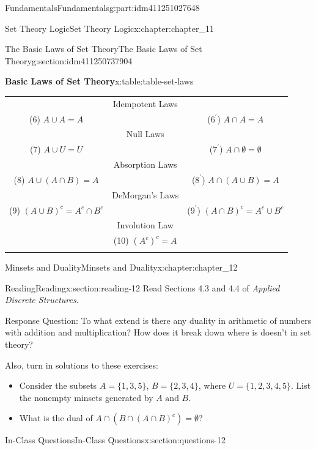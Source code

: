 \documentclass[oneside,10pt,]{book}
\numberwithin{equation}{section}
\newcommand{\hrulethin}  {\noalign{\hrule height 0.04em}}
\begin{document}
\begin{partptx}{Fundamentals}{}{Fundamentals}{}{}{g:part:idm411251027648}
\begin{chapterptx}{Set Theory Logic}{}{Set Theory Logic}{}{}{x:chapter:chapter_11}
\begin{sectionptx}{The Basic Laws of Set Theory}{}{The Basic Laws of Set Theory}{}{}{g:section:idm411250737904}
\begin{tableptx}{\textbf{Basic Laws of Set Theory}}{x:table:table-set-laws}{}
{\begin{tabular}{ccc}
&Idempotent Laws&\tabularnewline[0pt]
(6) \(A \cup  A = A\)&&(\(6^{\prime}\)) \(A\cap  A = A\)\tabularnewline\hrulethin
&Null Laws&\tabularnewline[0pt]
(7) \(A \cup  U = U\)&&(\(7^{\prime}\)) \(A \cap  \emptyset  =\emptyset\)\tabularnewline\hrulethin
&Absorption Laws&\tabularnewline[0pt]
(8) \(A \cup  (A\cap  B) = A\)&&(\(8^{\prime}\)) \(A\cap (A \cup  B) = A\)\tabularnewline\hrulethin
&DeMorgan's Laws&\tabularnewline[0pt]
(9) \((A \cup  B)^c= A^c\cap  B^c\)&&(\(9^{\prime}\)) \((A\cap  B)^c = A^c \cup  B^c\)\tabularnewline\hrulethin
&Involution Law&\tabularnewline[0pt]
&(10) \((A^c)^c= A\)&\tabularnewline\hrulethin
\end{tabular}
}%
\end{tableptx}%
\end{sectionptx}
\end{chapterptx}
%
\typeout{************************************************}
\typeout{************************************************}
%
\begin{chapterptx}{Minsets and Duality}{}{Minsets and Duality}{}{}{x:chapter:chapter_12}
\index{}%
%
%
\typeout{************************************************}
\typeout{************************************************}
%
\begin{sectionptx}{Reading}{}{Reading}{}{}{x:section:reading-12}
Read Sections 4.3 and 4.4 of \emph{Applied Discrete Structures}.%
\par
Response Question: To what extend is there any duality in arithmetic of numbers with addition and multiplication?  How does it break down where is doesn't in set theory?%
\par
Also, turn in solutions to these exercises:%
\begin{itemize}[label=\textbullet]
\item{}Consider the subsets \(A = \{1, 3, 5\}\), \(B = \{2,3,4\}\),  where \(U = \{1,2,3,4,5\}\).  List the nonempty minsets generated by \(A\textrm{ and }B\).%
\item{}What is the dual of \(A \cap (B\cap (A\cap B)^c)= \emptyset\)?%
\end{itemize}
%
\end{sectionptx}
%
%
\typeout{************************************************}
\typeout{************************************************}
%
\begin{sectionptx}{In-Class Questions}{}{In-Class Questions}{}{}{x:section:questions-12}
%
\begin{enumerate}[label=\arabic*.]

\end{enumerate}
\end{sectionptx}
\end{chapterptx}
\end{partptx}
\end{document}
